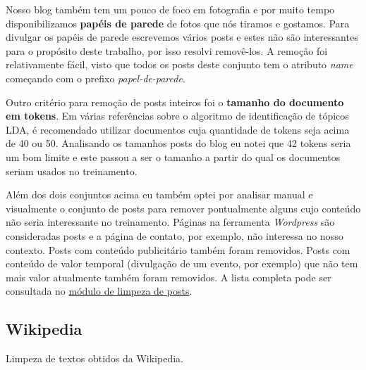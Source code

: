 Nosso blog também tem um pouco de foco em fotografia e por muito tempo disponibilizamos \textbf{papéis de parede} de fotos que nós tiramos e gostamos. 
Para divulgar os papéis de parede escrevemos vários posts e estes não são interessantes para o propósito deste trabalho, por isso resolvi removê-los.
A remoção foi relativamente fácil, visto que todos os posts deste conjunto tem o atributo \textit{name} começando com o prefixo \textit{papel-de-parede}.

Outro critério para remoção de posts inteiros foi o \textbf{tamanho do documento em tokens}. Em várias referências sobre o algoritmo de identificação 
de tópicos LDA, é recomendado utilizar documentos cuja quantidade de tokens seja acima de 40 ou 50. Analisando os tamanhos posts do blog eu notei 
que 42 tokens seria um bom limite e este passou a ser o tamanho a partir do qual os documentos seriam usados no treinamento.

Além dos dois conjuntos acima eu também optei por analisar manual e visualmente o conjunto de posts para remover pontualmente alguns cujo conteúdo 
não seria interessante no treinamento. Páginas na ferramenta \textit{Wordpress} são consideradas posts e a página de contato, por exemplo, 
não interessa no nosso contexto. Posts com conteúdo publicitário também foram removidos. Posts com conteúdo de valor temporal (divulgação de um 
evento, por exemplo) que não tem mais valor atualmente também foram removidos. A lista completa pode ser consultada no 
\href{https://github.com/heldergr/tcc-pucmg-2/blob/main/src/python/notebooks/limpeza/limpeza_posts.py}{módulo de limpeza de posts}.

\subsection{Wikipedia}

Limpeza de textos obtidos da Wikipedia.
